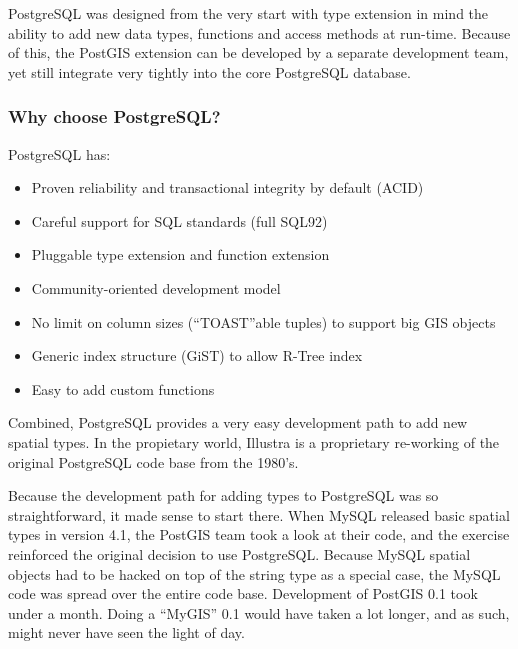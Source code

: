 \documentclass[a4paper,11pt,english]{sphinxmanual}
\begin{document}
PostgreSQL was designed from the very start with type extension in mind \textendash{} the ability to add new data types, functions and access methods at run-time. Because of this, the PostGIS extension can be developed by a separate development team, yet still integrate very tightly into the core PostgreSQL database.


\subsubsection{Why choose PostgreSQL?}
\label{\detokenize{introduction:why-choose-postgresql}}
PostgreSQL has:
\begin{itemize}
\item {} 
Proven reliability and transactional integrity by default (ACID)

\item {} 
Careful support for SQL standards (full SQL92)

\item {} 
Pluggable type extension and function extension

\item {} 
Community-oriented development model

\item {} 
No limit on column sizes (“TOAST”able tuples) to support big GIS objects

\item {} 
Generic index structure (GiST) to allow R-Tree index

\item {} 
Easy to add custom functions

\end{itemize}

Combined, PostgreSQL provides a very easy development path to add new spatial types. In the propietary world, Illustra is a proprietary re-working of the original PostgreSQL code base from the 1980’s.

Because the development path for adding types to PostgreSQL was so straightforward, it made sense to start there. When MySQL released basic spatial types in version 4.1, the PostGIS team took a look at their code, and the exercise reinforced the original decision to use PostgreSQL. Because MySQL spatial objects had to be hacked on top of the string type as a special case, the MySQL code was spread over the entire code base. Development of PostGIS 0.1 took under a month. Doing a “MyGIS” 0.1 would have taken a lot longer, and as such, might never have seen the light of day.
\end{document}
